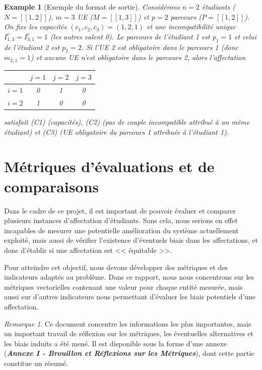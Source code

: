 \documentclass{rapport}
\theoremstyle{definition}
\theoremstyle{remark}
\theoremstyle{plain}
\newtheorem{example}{Example}
\theoremstyle{definition}
\theoremstyle{definition}
\theoremstyle{remark}
\newtheorem{remark}{Remarque}
\theoremstyle{definition}
\newcommand{\llbracket}{[\![}
\newcommand{\rrbracket}{]\!]}
\begin{document}
\begin{example}[Exemple du format de sortie]
    Considérons $n=2$ étudiants ($N=\llbracket 1,2\rrbracket$), $m=3$ UE ($M=\llbracket 1,3\rrbracket$) et $p=2$ parcours ($P=\llbracket 1,2\rrbracket$).
    On fixe les capacités $(c_1,c_2,c_3)=(1,2,1)$ et une incompatibilité unique $I^c_{1,3}=I^c_{3,1}=1$ (les autres valent 0). Le parcours de l'étudiant 1 est $p_1=1$ et celui de l'étudiant 2 est $p_2=2$.
    Si l'UE 2 est obligatoire dans le parcours 1 (donc $m_{2,1}=1$) et aucune UE n'est obligatoire dans le parcours 2, alors l'affectation
    \begin{center}
        \begin{tabular}{c|ccc}
            & $j=1$ & $j=2$ & $j=3$ \\
            \hline
            $i=1$ & 0 & 1 & 0 \\
            $i=2$ & 1 & 0 & 0
        \end{tabular}
    \end{center}
    satisfait (C1) (capacités), (C2) (pas de couple incompatible attribué à un même étudiant) et (C3) (UE obligatoire du parcours 1 attribuée à l'étudiant 1).
\end{example}


\section{Métriques d'évaluations et de comparaisons}\label{sec:Metric}

Dans le cadre de ce projet, il est important de pouvoir évaluer et comparer plusieurs instances d'affectation d'étudiants.
Sans cela, nous serions en effet incapables de mesurer une potentielle amélioration du système actuellement exploité, mais aussi de vérifier l'existence d'éventuels biais dans les affectations, et donc d'établir si une affectation est << équitable >>.

Pour atteindre cet objectif, nous devons développer des métriques et des indicateurs adaptés au problème.
Dans ce rapport, nous nous concentrons sur les métriques vectorielles contenant une valeur pour chaque entité mesurée, mais aussi sur d'autres indicateurs nous permettant d'évaluer les biais potentiels d'une affectation.

\begin{remark}
    Ce document concentre les informations les plus importantes, mais un important travail de réflexion sur les métriques, les éventuelles alternatives et les biais induits a été mené. Il est disponible sous la forme d'une annexe (\textbf{\textit{Annexe I - Brouillon et Réflexions sur les Métriques}}), dont cette partie constitue un résumé.
\end{remark}
\end{document}

